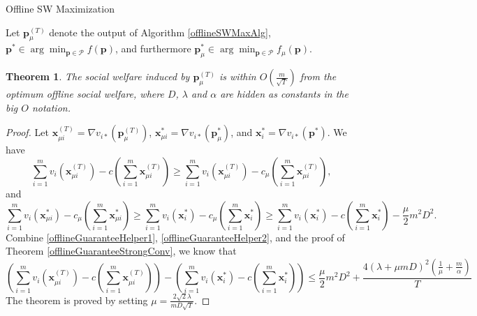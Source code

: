 \documentclass{article}
\newtheorem{theorem}{Theorem}[section]
\begin{document}
\begin{algorithm}
    \caption{Offline SW Maximization}
    \begin{algorithmic}
    \end{algorithmic}
    \label{offlineSWMaxAlg}
\end{algorithm}

Let $\mathbf{p}_{\mu}^{(T)}$ denote the output of Algorithm \ref{offlineSWMaxAlg}, $\mathbf{p}^*\in\arg\min_{\mathbf{p}\in \mathcal{P}}f(\mathbf{p})$, and furthermore $\mathbf{p}_{\mu}^*\in\arg\min_{\mathbf{p}\in \mathcal{P}}f_{\mu}(\mathbf{p})$.
\begin{theorem}\label{offlineGuarantee}
    The social welfare induced by $\mathbf{p}_{\mu}^{(T)}$ is within $O(\frac{m}{\sqrt{T}})$ from the optimum offline social welfare, where $D$, $\lambda$ and $\alpha$ are hidden as constants in the big $O$ notation.
\end{theorem}
\begin{proof}
    Let $\mathbf{x}_{\mu i}^{(T)}=\nabla v_{i*}(\mathbf{p}_{\mu}^{(T)})$, $\mathbf{x}_{\mu i}^*=\nabla v_{i*}(\mathbf{p}_{\mu}^*)$, and $\mathbf{x}_i^*=\nabla v_{i*}(\mathbf{p}^*)$. We have
    \begin{equation}\label{offlineGuaranteeHelper1}
        \sum_{i=1}^{m}v_i(\mathbf{x}_{\mu i}^{(T)})-c\left(\sum_{i=1}^{m}\mathbf{x}_{\mu i}^{(T)}\right)\ge \sum_{i=1}^{m}v_i(\mathbf{x}_{\mu i}^{(T)})-c_{\mu}\left(\sum_{i=1}^{m}\mathbf{x}_{\mu i}^{(T)}\right),
    \end{equation}
    and
    \begin{equation}\label{offlineGuaranteeHelper2}
        \sum_{i=1}^{m}v_i(\mathbf{x}_{\mu i}^*)-c_{\mu}\left(\sum_{i=1}^{m}\mathbf{x}_{\mu i}^*\right)\ge \sum_{i=1}^{m}v_i(\mathbf{x}_i^*)-c_{\mu}\left(\sum_{i=1}^{m}\mathbf{x}_i^*\right)\ge \sum_{i=1}^{m}v_i(\mathbf{x}_i^*)-c\left(\sum_{i=1}^{m}\mathbf{x}_i^*\right)-\frac{\mu}{2}m^2D^2.
    \end{equation}
    Combine \eqref{offlineGuaranteeHelper1}, \eqref{offlineGuaranteeHelper2}, and the proof of Theorem \ref{offlineGuaranteeStrongConv}, we know that
    \begin{equation}
        \left(\sum_{i=1}^{m}v_i(\mathbf{x}_{\mu i}^{(T)})-c\left(\sum_{i=1}^{m}\mathbf{x}_{\mu i}^{(T)}\right)\right)-\left(\sum_{i=1}^{m}v_i(\mathbf{x}_i^*)-c\left(\sum_{i=1}^{m}\mathbf{x}_i^*\right)\right)\le \frac{\mu}{2}m^2D^2+ \frac{4(\lambda+\mu mD)^2(\frac{1}{\mu}+\frac{m}{\alpha})}{T}
    \end{equation}
    The theorem is proved by setting $\mu=\frac{2\sqrt{2}\lambda}{mD\sqrt{T}}$.
\end{proof}
\end{document}
